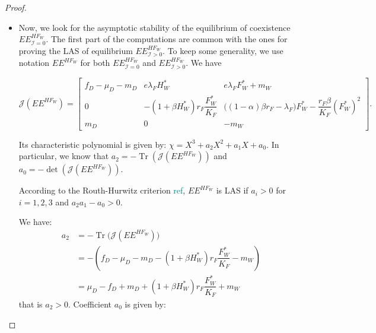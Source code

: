\documentclass{article}
\newcommand{\lfw}{\lambda_{F}}
\newcommand{\lfw}{\lambda_{F}}
\newcommand{\cI}{\mathcal{I}}
\newcommand{\marc}[1]{\textcolor{teal}{#1}}
\DeclareMathOperator{\Tr}{Tr}
\begin{document}
\begin{proof}
\begin{itemize}
\item Now, we look for the asymptotic stability of the equilibrium of coexistence $EE^{HF_W}_{\cI=0}$. The first part of the computations are common with the ones for proving the LAS of equilibrium $EE^{HF_W}_{\cI >0}$.   To keep some generality, we use notation $EE^{HF_W}$ for both $EE^{HF_W}_{\cI =0}$ and $EE^{HF_W}_{\cI >0}$. We have


\begin{equation*}
\mathcal{J}(EE^{H F_W}) = \begin{bmatrix}
f_D -\mu_D - m_D & e \lfw H_W^* & e \lfw F^*_W +m_W \\
0 & -(1 + \beta H_W^*)r_F \dfrac{F_W^*}{K_F} & \big( (1-\alpha)\beta r_F - \lfw \big) F_W^* -  \dfrac{r_F\beta}{K_F} (F_W^*)^2 \\
m_D & 0 & -m_W
\end{bmatrix}.
\end{equation*} 

Its characteristic polynomial is given by: $\chi = X^3 + a_2 X^2 + a_1 X + a_0$. In particular, we know that $a_2 = - \Tr(\mathcal{J}(EE^{H F_W}))$ and $a_0 = - \det (\mathcal{J}(EE^{H F_W}))$.

According to the Routh-Hurwitz criterion \marc{ref}, $EE^{H F_W}$ is LAS if $a_i > 0$ for $i=1,2,3$ and $a_2 a_1 - a_0 > 0$.

We have:
\begin{align}
a_2 &= - \Tr\Big(\mathcal{J}(EE^{H F_W})\Big) \\
 &= -(f_D - \mu_D - m_D - (1+\beta H_W^*)r_F \dfrac{F_W^*}{K_F} - m_W) \\
 &= \mu_D - f_D + m_D + (1+\beta H_W^*)r_F \dfrac{F_W^*}{K_F} + m_W \label{expressionA2}
\end{align}
that is $a_2>0$. Coefficient $a_0$ is given by:


\end{itemize}
\end{proof}
\end{document}
